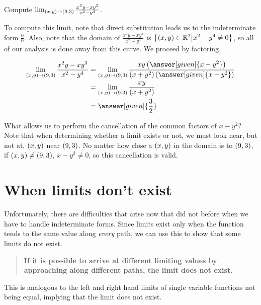 \documentclass{ximera}
\begin{document}
\begin{example}
  Compute $\lim_{\left(x,y\right)\to\left(9,3\right)} \frac{x^2y-xy^3}{x^2-y^4}$. 
  \begin{explanation}
   To compute this limit, note that direct substitution leads us to the indeterminate form $\frac{0}{0}$.  Also, note that the domain of $ \frac{x^2y-xy^3}{x^2-y^4}$ is $\left\{\left(x,y\right) \in \mathbb R^2 \big| x^2-y^4 \neq 0 \right\}$, so all of our analysis is done away from this curve.  We proceed by factoring.
    
    \begin{align*}
      \lim_{\point{x,y}\to\point{9,3}} \frac{x^2y-xy^3}{x^2-y^4}
      &=\lim_{\point{x,y}\to\point{9,3}} \frac{xy\left(\answer[given]{x-y^2}\right)}{(x+y^2)\left(\answer[given]{x-y^2}\right)}\\
      &=\lim_{\point{x,y}\to\point{9,3}} \frac{xy}{(x+y^2)}\\
      &=\answer[given]{\frac{3}{2}}
    \end{align*}
    
    What allows us to perform the cancellation of the common factors of $x-y^2$?  Note that when determining whether a limit exists or not, we must look near, but not at, $\left(x,y\right)$ near $\left(9,3\right)$.  No matter how close a $\left(x,y\right)$ in the domain is to $\left(9,3\right)$, if $\left(x,y\right) \neq \left(9,3\right)$, $x-y^2 \neq 0$, so this cancellation is valid.
  \end{explanation}
\end{example}


\section{When limits don't exist}
Unfortunately, there are difficulties that arise now that did not before when we have to handle indeterminate forms.  Since limits exist only when the function tends to the same value along \emph{every} path, we can use this to show that some limits do not exist.  

\begin{quote}
  \textbf{If it is possible to arrive at different limiting values by
    approaching along different paths, the limit does not exist.}
\end{quote}

This is analogous to the left and right hand limits of single variable
functions not being equal, implying that the limit does not exist.
 
\end{document}
